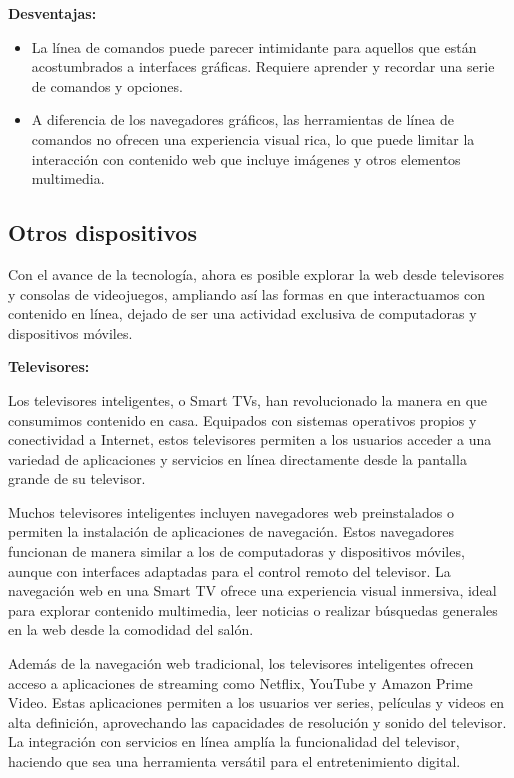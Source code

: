 \documentclass[12pt]{article}
\begin{document}
                        \textbf{Desventajas:}

                        \begin{itemize}
                                \item La línea de comandos puede parecer intimidante para aquellos que están acostumbrados a interfaces gráficas. Requiere aprender y recordar una serie de comandos y opciones.
                                \item A diferencia de los navegadores gráficos, las herramientas de línea de comandos no ofrecen una experiencia visual rica, lo que puede limitar la interacción con contenido web que incluye imágenes y otros elementos multimedia.
                        \end{itemize}


                \subsection{Otros dispositivos}
                        Con el avance de la tecnología, ahora es posible explorar la web desde televisores y consolas de videojuegos, ampliando así las formas en que interactuamos con contenido en línea, dejado de ser una actividad exclusiva de computadoras y dispositivos móviles.

                        \textbf{Televisores:}
                        
                        Los televisores inteligentes, o Smart TVs, han revolucionado la manera en que consumimos contenido en casa. Equipados con sistemas operativos propios y conectividad a Internet, estos televisores permiten a los usuarios acceder a una variedad de aplicaciones y servicios en línea directamente desde la pantalla grande de su televisor.
                       
                        Muchos televisores inteligentes incluyen navegadores web preinstalados o permiten la instalación de aplicaciones de navegación. Estos navegadores funcionan de manera similar a los de computadoras y dispositivos móviles, aunque con interfaces adaptadas para el control remoto del televisor. La navegación web en una Smart TV ofrece una experiencia visual inmersiva, ideal para explorar contenido multimedia, leer noticias o realizar búsquedas generales en la web desde la comodidad del salón.

                        Además de la navegación web tradicional, los televisores inteligentes ofrecen acceso a aplicaciones de streaming como Netflix, YouTube y Amazon Prime Video. Estas aplicaciones permiten a los usuarios ver series, películas y videos en alta definición, aprovechando las capacidades de resolución y sonido del televisor. La integración con servicios en línea amplía la funcionalidad del televisor, haciendo que sea una herramienta versátil para el entretenimiento digital.
\end{document}
